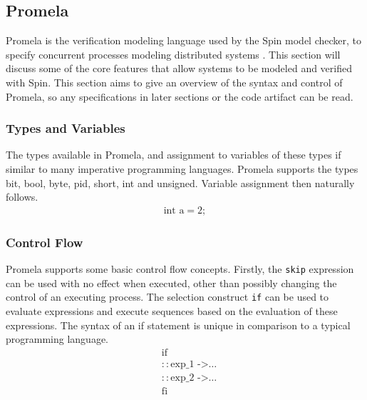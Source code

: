 \subsection{Promela} \label{sec:promela}
Promela is the verification modeling language used by the Spin model checker, to specify concurrent processes modeling distributed systems \cite{spin}. This section will discuss some of the core features that allow systems to be modeled and verified with Spin. This section aims to give an overview of the syntax and control of Promela, so any specifications in later sections or the code artifact can be read.
\subsubsection[]{Types and Variables}
The types available in Promela, and assignment to variables of these types if similar to many imperative programming languages. Promela supports the types bit, bool, byte, pid, short, int and unsigned. Variable assignment then naturally follows.
\[
\begin{aligned}
\text{int a} = 2;
\end{aligned}
\]
\subsubsection[]{Control Flow}
Promela supports some basic control flow concepts. Firstly, the \texttt{skip} expression can be used with no effect when executed, other than possibly changing the control of an executing process. The selection construct \texttt{if} can be used to evaluate expressions and execute sequences based on the evaluation of these expressions. The syntax of an if statement is unique in comparison to a typical programming language.
\[
\begin{aligned}
& \text{if} \\
& :: \text{exp\_1 ->} \dots \\
& :: \text{exp\_2 ->} \dots \\
& \text{fi} \\
\end{aligned}    
\]


